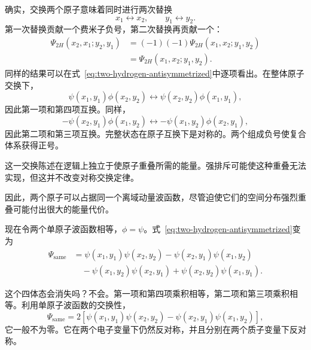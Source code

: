 确实，交换两个原子意味着同时进行两次替换
\begin{equation}
x_1\leftrightarrow x_2,
\qquad
y_1\leftrightarrow y_2.
\end{equation}
第一次替换贡献一个费米子负号，第二次替换再贡献一个：
\begin{equation}
\begin{aligned}
\Psi_{2H}(x_2,x_1;y_2,y_1)
&=(-1)(-1)\Psi_{2H}(x_1,x_2;y_1,y_2)\\
&=\Psi_{2H}(x_1,x_2;y_1,y_2).
\end{aligned}
\end{equation}
同样的结果可以在式~\eqref{eq:two-hydrogen-antisymmetrized}中逐项看出。在整体原子交换下，
\begin{equation}
\psi(x_1,y_1)\phi(x_2,y_2)
\longleftrightarrow
\psi(x_2,y_2)\phi(x_1,y_1),
\end{equation}
因此第一项和第四项互换。同样，
\begin{equation}
-\psi(x_2,y_1)\phi(x_1,y_2)
\longleftrightarrow
-\psi(x_1,y_2)\phi(x_2,y_1),
\end{equation}
因此第二项和第三项互换。完整状态在原子互换下是对称的。两个组成负号使复合体系获得正号。

这一交换陈述在逻辑上独立于使原子重叠所需的能量。强排斥可能使这种重叠无法实现，但这并不改变对称交换定律。

\begin{classroomqa}
\end{classroomqa}

因此，两个原子可以占据同一个离域动量波函数，尽管迫使它们的空间分布强烈重叠可能付出很大的能量代价。

现在令两个单原子波函数相等，\(\phi=\psi\)。式~\eqref{eq:two-hydrogen-antisymmetrized}变为
\begin{align}
\Psi_{\mathrm{same}}
&=\psi(x_1,y_1)\psi(x_2,y_2)
-\psi(x_2,y_1)\psi(x_1,y_2)\nonumber\\
&\quad
-\psi(x_1,y_2)\psi(x_2,y_1)
+\psi(x_2,y_2)\psi(x_1,y_1).
\end{align}

这个四体态会消失吗？不会。第一项和第四项乘积相等，第二项和第三项乘积相等。利用单原子波函数的交换性，
\begin{equation}
\Psi_{\mathrm{same}}
=
2\left[
\psi(x_1,y_1)\psi(x_2,y_2)
-\psi(x_2,y_1)\psi(x_1,y_2)
\right],
\label{eq:same-hydrogen-state}
\end{equation}
它一般不为零。它在两个电子变量下仍然反对称，并且分别在两个质子变量下反对称。

